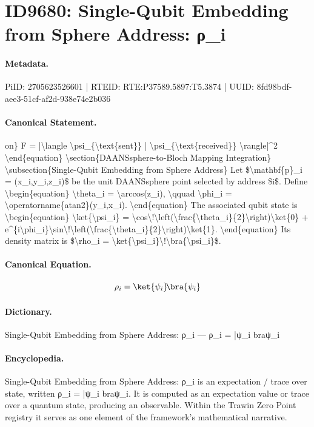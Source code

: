 \section*{ID9680: Single-Qubit Embedding from Sphere Address: ρ\_i}
\paragraph{Metadata.}
PiID: 2705623526601 | RTEID: RTE:P37589.5897:T5.3874 | UUID: 8fd98bdf-aee3-51cf-af2d-938e74e2b036

\paragraph{Canonical Statement.}
on\} F = |\textbackslash{}langle \textbackslash{}psi\_\{\textbackslash{}text\{sent\}\} | \textbackslash{}psi\_\{\textbackslash{}text\{received\}\} \textbackslash{}rangle|\textasciicircum{}2 \textbackslash{}end\{equation\} \textbackslash{}section\{DAANSsphere-to-Bloch Mapping Integration\} \textbackslash{}subsection\{Single-Qubit Embedding from Sphere Address\} Let \$\textbackslash{}mathbf\{p\}\_i = (x\_i,y\_i,z\_i)\$ be the unit DAANSsphere point selected by address \$i\$. Define \textbackslash{}begin\{equation\} \textbackslash{}theta\_i = \textbackslash{}arccos(z\_i), \textbackslash{}qquad \textbackslash{}phi\_i = \textbackslash{}operatorname\{atan2\}(y\_i,x\_i). \textbackslash{}end\{equation\} The associated qubit state is \textbackslash{}begin\{equation\} \textbackslash{}ket\{\textbackslash{}psi\_i\} = \textbackslash{}cos\textbackslash{}!\textbackslash{}left(\textbackslash{}frac\{\textbackslash{}theta\_i\}\{2\}\textbackslash{}right)\textbackslash{}ket\{0\} + e\textasciicircum{}\{i\textbackslash{}phi\_i\}\textbackslash{}sin\textbackslash{}!\textbackslash{}left(\textbackslash{}frac\{\textbackslash{}theta\_i\}\{2\}\textbackslash{}right)\textbackslash{}ket\{1\}. \textbackslash{}end\{equation\} Its density matrix is \$\textbackslash{}rho\_i = \textbackslash{}ket\{\textbackslash{}psi\_i\}\textbackslash{}!\textbackslash{}bra\{\textbackslash{}psi\_i\}\$.

\paragraph{Canonical Equation.}
\[
\rho_i = \ket{\psi_i}\!\bra{\psi_i}
\]

\paragraph{Dictionary.}
Single-Qubit Embedding from Sphere Address: ρ\_i — ρ\_i = |ψ\_i braψ\_i

\paragraph{Encyclopedia.}
Single-Qubit Embedding from Sphere Address: ρ\_i is an expectation / trace over state, written ρ\_i = |ψ\_i braψ\_i. It is computed as an expectation value or trace over a quantum state, producing an observable. Within the Trawin Zero Point registry it serves as one element of the framework's mathematical narrative.
